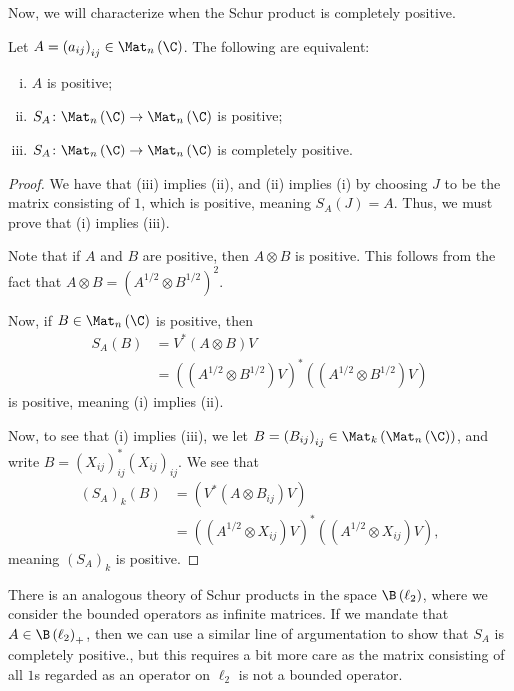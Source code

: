 \documentclass[10pt]{mypackage}
\begin{document}
Now, we will characterize when the Schur product is completely positive.
\begin{theorem}
  Let $A = \left( a_{ij} \right)_{ij}\in \Mat_n\left( \C \right)$. The following are equivalent:
  \begin{enumerate}[(i)]
    \item $A$ is positive;
    \item $S_A\colon \Mat_n\left( \C \right)\rightarrow \Mat_n\left( \C \right)$ is positive;
    \item $S_A\colon \Mat_n\left( \C \right)\rightarrow \Mat_n\left( \C \right)$ is completely positive.
  \end{enumerate}
\end{theorem}
\begin{proof}
  We have that (iii) implies (ii), and (ii) implies (i) by choosing $J$ to be the matrix consisting of $1$, which is positive, meaning $S_A\left( J \right) = A$. Thus, we must prove that (i) implies (iii).\newline

  Note that if $A$ and $B$ are positive, then $A\otimes B$ is positive. This follows from the fact that $A\otimes B = \left( A^{1/2}\otimes B^{1/2} \right)^2$.\newline

  Now, if $B\in \Mat_n\left( \C \right)$ is positive, then
  \begin{align*}
    S_A\left( B \right) &= V^{\ast}\left( A\otimes B \right)V\\
                        &= \left( \left( A^{1/2}\otimes B^{1/2} \right)V \right)^{\ast}\left( \left( A^{1/2}\otimes B^{1/2} \right)V \right)
  \end{align*}
  is positive, meaning (i) implies (ii).\newline

  Now, to see that (i) implies (iii), we let $B = \left( B_{ij} \right)_{ij}\in \Mat_k\left( \Mat_n\left( \C \right) \right)$, and write $B = \left( X_{ij} \right)_{ij}^{\ast}\left( X_{ij} \right)_{ij}$. We see that
  \begin{align*}
    \left( S_{A} \right)_k \left( B \right) &= \left( V^{\ast}\left( A\otimes B_{ij} \right)V \right)\\
                                            &= \left( \left( A^{1/2}\otimes X_{ij} \right)V \right)^{\ast}\left( \left( A^{1/2}\otimes X_{ij} \right)V \right),
  \end{align*}
  meaning $\left( S_A \right)_{k}$ is positive.
\end{proof}
There is an analogous theory of Schur products in the space $\B\left( \ell_2 \right)$, where we consider the bounded operators as infinite matrices. If we mandate that $A\in \B\left( \ell_2 \right)_{+}$, then we can use a similar line of argumentation to show that $S_A$ is completely positive., but this requires a bit more care as the matrix consisting of all $1$s regarded as an operator on $\ell_2$ is not a bounded operator.\newline
\end{document}
